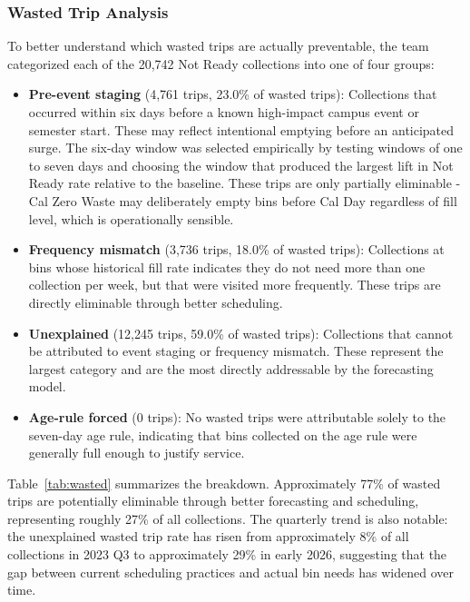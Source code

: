 \documentclass[11pt]{article}
\begin{document}
\subsubsection*{Wasted Trip Analysis}

To better understand which wasted trips are actually preventable, the team categorized
each of the 20,742 Not Ready collections into one of four groups:

\begin{itemize}
  \item \textbf{Pre-event staging} (4,761 trips, 23.0\% of wasted trips): Collections
  that occurred within six days before a known high-impact campus event or semester start.
  These may reflect intentional emptying before an anticipated surge. The six-day window
  was selected empirically by testing windows of one to seven days and choosing the window
  that produced the largest lift in Not Ready rate relative to the baseline. These trips
  are only partially eliminable - Cal Zero Waste may deliberately empty bins before Cal
  Day regardless of fill level, which is operationally sensible.

  \item \textbf{Frequency mismatch} (3,736 trips, 18.0\% of wasted trips): Collections
  at bins whose historical fill rate indicates they do not need more than one collection
  per week, but that were visited more frequently. These trips are directly eliminable
  through better scheduling.

  \item \textbf{Unexplained} (12,245 trips, 59.0\% of wasted trips): Collections that
  cannot be attributed to event staging or frequency mismatch. These represent the largest
  category and are the most directly addressable by the forecasting model.

  \item \textbf{Age-rule forced} (0 trips): No wasted trips were attributable solely to
  the seven-day age rule, indicating that bins collected on the age rule were generally
  full enough to justify service.
\end{itemize}

Table~\ref{tab:wasted} summarizes the breakdown. Approximately 77\% of wasted trips are
potentially eliminable through better forecasting and scheduling, representing roughly
27\% of all collections. The quarterly trend is also notable: the unexplained wasted trip
rate has risen from approximately 8\% of all collections in 2023 Q3 to approximately 29\%
in early 2026, suggesting that the gap between current scheduling practices and actual bin
needs has widened over time.
\end{document}

